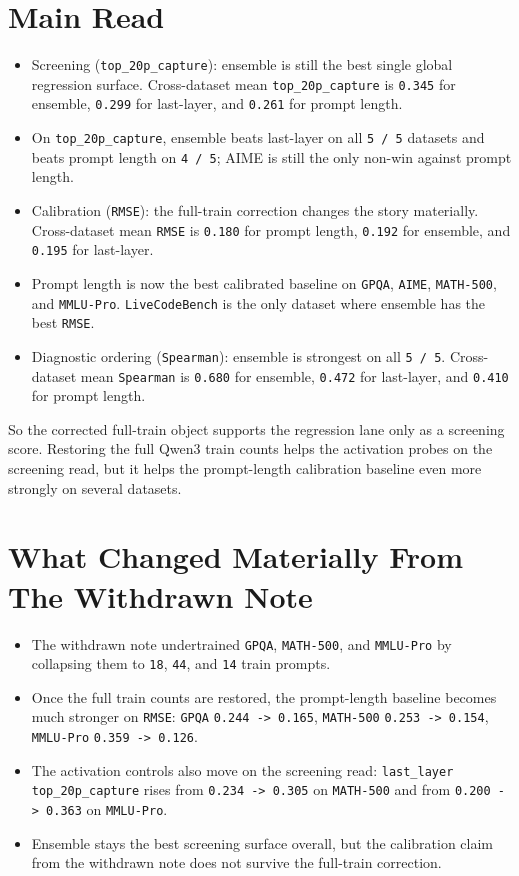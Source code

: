 \documentclass[11pt]{article}
\begin{document}
\section{Main Read}

\begin{itemize}
\item Screening (\texttt{top\_20p\_capture}): ensemble is still the best single global regression surface. Cross-dataset mean \texttt{top\_20p\_capture} is \texttt{0.345} for ensemble, \texttt{0.299} for last-layer, and \texttt{0.261} for prompt length.
\item On \texttt{top\_20p\_capture}, ensemble beats last-layer on all \texttt{5 / 5} datasets and beats prompt length on \texttt{4 / 5}; AIME is still the only non-win against prompt length.
\item Calibration (\texttt{RMSE}): the full-train correction changes the story materially. Cross-dataset mean \texttt{RMSE} is \texttt{0.180} for prompt length, \texttt{0.192} for ensemble, and \texttt{0.195} for last-layer.
\item Prompt length is now the best calibrated baseline on \texttt{GPQA}, \texttt{AIME}, \texttt{MATH-500}, and \texttt{MMLU-Pro}. \texttt{LiveCodeBench} is the only dataset where ensemble has the best \texttt{RMSE}.
\item Diagnostic ordering (\texttt{Spearman}): ensemble is strongest on all \texttt{5 / 5}. Cross-dataset mean \texttt{Spearman} is \texttt{0.680} for ensemble, \texttt{0.472} for last-layer, and \texttt{0.410} for prompt length.
\end{itemize}

So the corrected full-train object supports the regression lane only as a screening
score. Restoring the full Qwen3 train counts helps the activation probes on the
screening read, but it helps the prompt-length calibration baseline even more
strongly on several datasets.

\section{What Changed Materially From The Withdrawn Note}

\begin{itemize}
\item The withdrawn note undertrained \texttt{GPQA}, \texttt{MATH-500}, and \texttt{MMLU-Pro} by collapsing them to \texttt{18}, \texttt{44}, and \texttt{14} train prompts.
\item Once the full train counts are restored, the prompt-length baseline becomes much stronger on \texttt{RMSE}: \texttt{GPQA} \texttt{0.244 -> 0.165}, \texttt{MATH-500} \texttt{0.253 -> 0.154}, \texttt{MMLU-Pro} \texttt{0.359 -> 0.126}.
\item The activation controls also move on the screening read: \texttt{last\_layer top\_20p\_capture} rises from \texttt{0.234 -> 0.305} on \texttt{MATH-500} and from \texttt{0.200 -> 0.363} on \texttt{MMLU-Pro}.
\item Ensemble stays the best screening surface overall, but the calibration claim from the withdrawn note does not survive the full-train correction.
\end{itemize}
\end{document}
